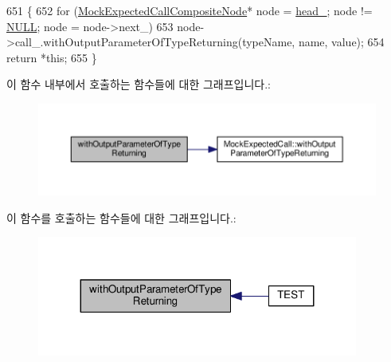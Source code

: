 \begin{DoxyCode}
651 \{
652     \textcolor{keywordflow}{for} (\hyperlink{struct_mock_expected_call_composite_node}{MockExpectedCallCompositeNode}* node = 
      \hyperlink{class_mock_expected_call_composite_ab2cbb66e9c0941965ada23b66f2e3ca1}{head\_}; node != \hyperlink{openavb__types__base__pub_8h_a070d2ce7b6bb7e5c05602aa8c308d0c4}{NULL}; node = node->next\_)
653         node->call\_.withOutputParameterOfTypeReturning(typeName, name, value);
654     \textcolor{keywordflow}{return} *\textcolor{keyword}{this};
655 \}
\end{DoxyCode}


이 함수 내부에서 호출하는 함수들에 대한 그래프입니다.\+:
\nopagebreak
\begin{figure}[H]
\begin{center}
\leavevmode
\includegraphics[width=350pt]{class_mock_expected_call_composite_a06e26c3b748887a5ad7b696576f0cee3_cgraph}
\end{center}
\end{figure}




이 함수를 호출하는 함수들에 대한 그래프입니다.\+:
\nopagebreak
\begin{figure}[H]
\begin{center}
\leavevmode
\includegraphics[width=299pt]{class_mock_expected_call_composite_a06e26c3b748887a5ad7b696576f0cee3_icgraph}
\end{center}
\end{figure}


